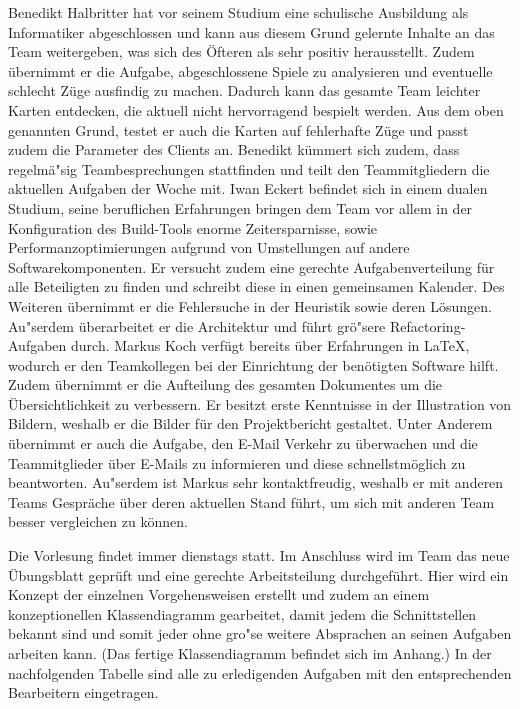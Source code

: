Benedikt Halbritter hat vor seinem Studium eine schulische Ausbildung als Informatiker abgeschlossen und kann aus diesem Grund gelernte Inhalte an das Team weitergeben, was sich des \"Ofteren als sehr positiv herausstellt.
Zudem \"ubernimmt er die Aufgabe, abgeschlossene Spiele zu analysieren und eventuelle schlecht Z\"uge ausfindig zu machen.
Dadurch kann das gesamte Team leichter Karten entdecken, die aktuell nicht hervorragend bespielt werden.
Aus dem oben genannten Grund, testet er auch die Karten auf fehlerhafte Z\"uge und passt zudem die Parameter des Clients an.
Benedikt k\"ummert sich zudem, dass regelm\"a"sig Teambesprechungen stattfinden und teilt den Teammitgliedern die aktuellen Aufgaben der Woche mit.
Iwan Eckert befindet sich in einem dualen Studium, seine beruflichen Erfahrungen bringen dem Team vor allem in der Konfiguration des Build-Tools enorme Zeitersparnisse, sowie Performanzoptimierungen aufgrund von Umstellungen auf andere Softwarekomponenten.
Er versucht zudem eine gerechte Aufgabenverteilung f\"ur alle Beteiligten zu finden und schreibt diese in einen gemeinsamen Kalender.
Des Weiteren \"ubernimmt er die Fehlersuche in der Heuristik sowie deren L\"osungen.
Au"serdem \"uberarbeitet er die Architektur und f\"uhrt gr\"o"sere Refactoring-Aufgaben durch.
Markus Koch verf\"ugt bereits \"uber Erfahrungen in \LaTeX, wodurch er den Teamkollegen bei der Einrichtung der ben\"otigten Software hilft.
Zudem \"ubernimmt er die Aufteilung des gesamten Dokumentes um die \"Ubersichtlichkeit zu verbessern.
Er besitzt erste Kenntnisse in der Illustration von Bildern, weshalb er die Bilder f\"ur den Projektbericht gestaltet.
Unter Anderem \"ubernimmt er auch die Aufgabe, den E-Mail Verkehr zu \"uberwachen und die Teammitglieder \"uber E-Mails zu informieren und diese schnellstm\"oglich zu beantworten.
Au"serdem ist Markus sehr kontaktfreudig, weshalb er mit anderen Teams Gespr\"ache \"uber deren aktuellen Stand f\"uhrt, um sich mit anderen Team besser vergleichen zu k\"onnen.

Die Vorlesung findet immer dienstags statt.
Im Anschluss wird im Team das neue \"Ubungsblatt gepr\"uft und eine gerechte Arbeitsteilung durchgef\"uhrt.
Hier wird ein Konzept der einzelnen Vorgehensweisen erstellt und zudem an einem konzeptionellen Klassendiagramm gearbeitet, damit jedem die Schnittstellen bekannt sind und somit jeder ohne gro"se weitere Absprachen an seinen Aufgaben arbeiten kann.
(Das fertige Klassendiagramm befindet sich im Anhang.)
In der nachfolgenden Tabelle sind alle zu erledigenden Aufgaben mit den entsprechenden Bearbeitern eingetragen.

